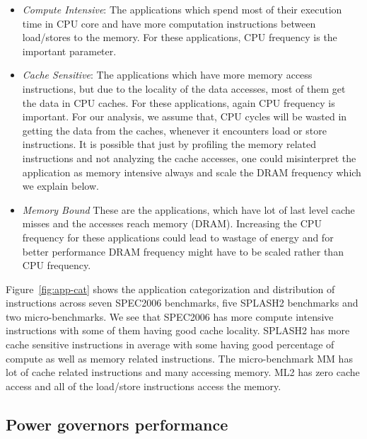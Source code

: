 \begin{itemize} 
\item \textit{Compute Intensive}: The applications which spend most of their execution
time in CPU core and have more computation instructions
between load/stores to the memory. For these applications, CPU
frequency is the important parameter.
\item \textit{Cache Sensitive}: The applications which have more memory access instructions,
but due to the locality of the data accesses, most of them get the data in CPU caches.
For these applications, again CPU frequency is important. 
For our analysis, we assume that, 
CPU cycles will be wasted in getting the data from the caches, whenever
it encounters load or store instructions. 
It is possible that just
by profiling the memory related instructions and not analyzing the cache accesses,
one could misinterpret the application as memory intensive always
and scale the DRAM frequency which we explain below. 
\item \textit{Memory Bound} These are the applications, which have lot of last level cache misses
and the accesses reach memory (DRAM). Increasing the CPU frequency for these applications could 
lead to wastage of energy and for better performance DRAM frequency might have to
be scaled rather than CPU frequency. 
\end{itemize}

Figure~\ref{fig:app-cat} shows the application categorization and distribution of instructions 
across seven SPEC2006 benchmarks, five SPLASH2 benchmarks and two micro-benchmarks. 
We see that SPEC2006 has more compute intensive instructions with some of them
having good cache locality. SPLASH2 has more cache sensitive instructions 
in average with some having good percentage of compute as well as memory related instructions. 
The micro-benchmark MM has lot of cache related instructions and many accessing memory.
ML2 has zero cache access and all of the load/store  instructions access the memory.

\subsection{Power governors performance}

